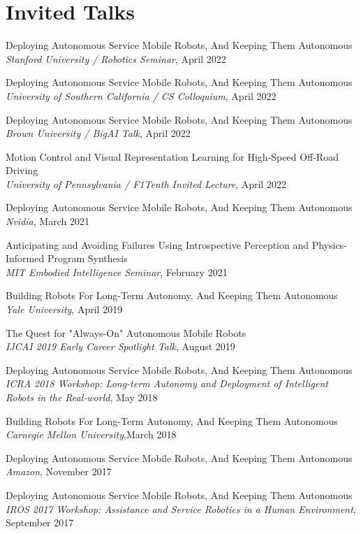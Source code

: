 \documentclass[Times]{article}
\begin{document}
\section*{Invited Talks}

Deploying Autonomous Service Mobile Robots, And Keeping Them Autonomous
\\
{\em Stanford University / Robotics Seminar}, April 2022

Deploying Autonomous Service Mobile Robots, And Keeping Them Autonomous
\\
{\em University of Southern California / CS Colloquium}, April 2022

Deploying Autonomous Service Mobile Robots, And Keeping Them Autonomous
\\
{\em Brown University / BigAI Talk}, April 2022

Motion Control and Visual Representation Learning for High-Speed Off-Road Driving
\\
{\em University of Pennsylvania / F1Tenth Invited Lecture}, April 2022

Deploying Autonomous Service Mobile Robots, And Keeping Them Autonomous
\\
{\em Nvidia}, March 2021

Anticipating and Avoiding Failures Using Introspective Perception and Physics-Informed Program Synthesis\\
{\em MIT Embodied Intelligence Seminar}, February 2021

Building Robots For Long-Term Autonomy, And Keeping Them Autonomous\\
{\em Yale University}, April 2019

The Quest for "Always-On" Autonomous Mobile Robots\\
{\em IJCAI 2019 Early Career Spotlight Talk}, August 2019

Deploying Autonomous Service Mobile Robots, And Keeping Them Autonomous\\
{\em ICRA 2018 Workshop: Long-term Autonomy and Deployment of Intelligent Robots
in the Real-world}, May 2018

Building Robots For Long-Term Autonomy, And Keeping Them Autonomous\\
{\em Carnegie Mellon University},March 2018

Deploying Autonomous Service Mobile Robots, And Keeping Them Autonomous\\
{\em Amazon}, November 2017

Deploying Autonomous Service Mobile Robots, And Keeping Them Autonomous\\
{\em IROS 2017 Workshop: Assistance and Service Robotics in a Human
Environment}, September 2017
\end{document}
